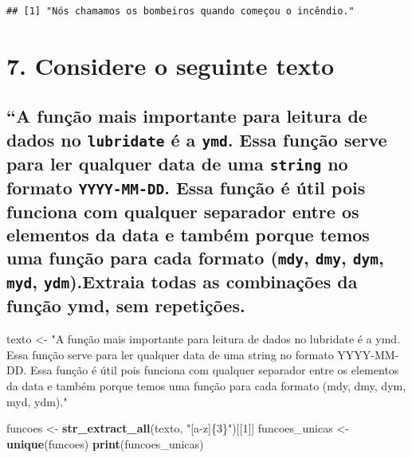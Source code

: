 \documentclass[
]{article}
\newenvironment{Shaded}{\begin{snugshade}}{\end{snugshade}}
\newcommand{\DecValTok}[1]{\textcolor[rgb]{0.00,0.00,0.81}{#1}}
\newcommand{\FunctionTok}[1]{\textcolor[rgb]{0.13,0.29,0.53}{\textbf{#1}}}
\newcommand{\NormalTok}[1]{#1}
\newcommand{\OtherTok}[1]{\textcolor[rgb]{0.56,0.35,0.01}{#1}}
\newcommand{\StringTok}[1]{\textcolor[rgb]{0.31,0.60,0.02}{#1}}
\begin{document}
\begin{verbatim}
## [1] "Nós chamamos os bombeiros quando começou o incêndio."
\end{verbatim}

\section{7. Considere o seguinte
texto}\label{considere-o-seguinte-texto}

\subsection{\texorpdfstring{``A função mais importante para leitura de
dados no \texttt{lubridate} é a \texttt{ymd}. Essa função serve para ler
qualquer data de uma \texttt{string} no formato \texttt{YYYY-MM-DD}.
Essa função é útil pois funciona com qualquer separador entre os
elementos da data e também porque temos uma função para cada formato
(\texttt{mdy}, \texttt{dmy}, \texttt{dym}, \texttt{myd},
\texttt{ydm}).Extraia todas as combinações da função ymd, sem
repetições.}{``A função mais importante para leitura de dados no lubridate é a ymd. Essa função serve para ler qualquer data de uma string no formato YYYY-MM-DD. Essa função é útil pois funciona com qualquer separador entre os elementos da data e também porque temos uma função para cada formato (mdy, dmy, dym, myd, ydm).Extraia todas as combinações da função ymd, sem repetições.}}\label{a-funuxe7uxe3o-mais-importante-para-leitura-de-dados-no-lubridate-uxe9-a-ymd.-essa-funuxe7uxe3o-serve-para-ler-qualquer-data-de-uma-string-no-formato-yyyy-mm-dd.-essa-funuxe7uxe3o-uxe9-uxfatil-pois-funciona-com-qualquer-separador-entre-os-elementos-da-data-e-tambuxe9m-porque-temos-uma-funuxe7uxe3o-para-cada-formato-mdy-dmy-dym-myd-ydm.extraia-todas-as-combinauxe7uxf5es-da-funuxe7uxe3o-ymd-sem-repetiuxe7uxf5es.}

\begin{Shaded}
\begin{Highlighting}[]
\NormalTok{texto }\OtherTok{\textless{}{-}} \StringTok{"A função mais importante para leitura de dados no \textasciigrave{}lubridate\textasciigrave{} é a \textasciigrave{}ymd\textasciigrave{}. Essa função serve para ler qualquer data de uma \textasciigrave{}string\textasciigrave{} no formato \textasciigrave{}YYYY{-}MM{-}DD\textasciigrave{}. Essa função é útil pois funciona com qualquer separador entre os elementos da data e também porque temos uma função para cada formato (\textasciigrave{}mdy\textasciigrave{}, \textasciigrave{}dmy\textasciigrave{}, \textasciigrave{}dym\textasciigrave{}, \textasciigrave{}myd\textasciigrave{}, \textasciigrave{}ydm\textasciigrave{})."}

\NormalTok{funcoes }\OtherTok{\textless{}{-}} \FunctionTok{str\_extract\_all}\NormalTok{(texto, }\StringTok{"\textasciigrave{}[a{-}z]\{3\}\textasciigrave{}"}\NormalTok{)[[}\DecValTok{1}\NormalTok{]]}
\NormalTok{funcoes\_unicas }\OtherTok{\textless{}{-}} \FunctionTok{unique}\NormalTok{(funcoes)}
\FunctionTok{print}\NormalTok{(funcoes\_unicas)}
\end{Highlighting}
\end{Shaded}
\end{document}
